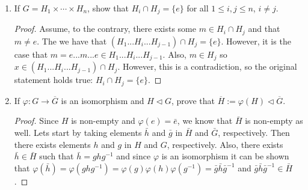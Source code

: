 \documentclass[a4paper]{article}
\newcommand{\bb}[1]{\mathbb{#1}}								%
\begin{document}
\begin{enumerate}[leftmargin=*, label=(\textbf{\arabic*})]
\begin{enumerate}[leftmargin=*, label=(\textbf{\alph*})]
\begin{proof}
Finally, to establish an inverse it can be shown that $$-p(t) = \sum_{k=0}^n (-a_k) t^k \in \bb{P}_n$$
\end{proof}



\item Prove that $\bb{P}_n \cong \bb{R}^{n+1}$.
\end{enumerate}

\begin{proof}
Similarly from Problem $1$, we need to show an isomorphism between the relation $\phi: \bb{P}_n \cong \bb{R}^{n+1}$.  This relationship can be defined as: $\phi: (p(t) = \sum_{k=0}^n a_k t^k) = \begin{bmatrix} a_0 \\ a_1 \\ \cdot \\ \cdot \\ \cdot \\ a_n \end{bmatrix}$
\end{proof}


\item If $G = H_1 \times \cdots \times H_n$, show that $H_i \cap H_j = \{ e \}$ for all $1 \leq i,j \leq n$, $i \neq j$.

\begin{proof}
Assume, to the contrary, there exists some $m \in H_i \cap H_j$ and that $m \neq e$.  The we have that $(H_1 ... H_i ... H_{j-1}) \cap H_j = \{e \}$.  However, it is the case that $m = e ... m ... e \in H_1 ... H_i ... H_{j-1}$.  Also, $m \in H_j$ so $x \in (H_1 ... H_i ... H_{j-1}) \cap H_j$.  However, this is a contradiction, so the original statement holds true: $H_i \cap H_j = \{ e \}$.  
\end{proof}



\item If $\varphi:G \longrightarrow \overline{G}$ is an isomorphism and $H \lhd G$, prove that $\overline{H} := \varphi(H) \lhd \overline{G}$.

\begin{proof}
Since $H$ is non-empty and $\varphi(e) = \bar{e}$, we know that $\bar{H}$ is non-empty as well.  Lets start by taking elements $\bar{h}$ and $\bar{g}$ in $\bar{H}$ and $\bar{G}$, respectively.  Then there exists elements $h$ and $g$ in $H$ and $G$, respectively.  Also, there exists $\bar{h} \in \bar{H}$ such that $\bar{h} = ghg^{-1}$ and since $\varphi$ is an isomorphism it can be shown that $\varphi(\bar{h}) = \varphi(ghg^{-1}) = \varphi(g)\varphi(h)\varphi(g^{-1}) = \bar{g}\bar{h}\bar{g}^{-1}$ and $\bar{g}\bar{h}\bar{g}^{-1} \in \bar{H}$.  
\end{proof}


\end{enumerate}
\end{document}

